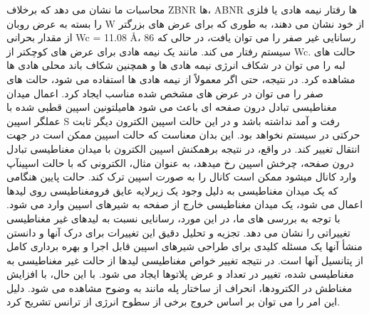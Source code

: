 محاسبات ما نشان می دهد که برخلاف ZBNR ها، ABNR ها رفتار نیمه هادی یا فلزی را بسته به عرض روبان W از خود نشان می دهند، به طوری که برای عرض های بزرگتر از مقدار بحرانی Wc = 11.08 Å، 86 رسانایی غیر صفر را می توان یافت، در حالی که سیستم رفتار می کند. مانند یک نیمه هادی برای عرض های کوچکتر از Wc. حالت های لبه را می توان در شکاف انرژی نیمه هادی ها و همچنین شکاف باند محلی هادی ها مشاهده کرد. در نتیجه، حتی اگر معمولاً از نیمه هادی ها استفاده می شود، حالت های صفر را می توان در عرض های مشخص شده مناسب ایجاد کرد. اعمال میدان مغناطیسی تبادل درون صفحه ای باعث می شود هامیلتونین اسپین قطبی شده با عملگر اسپین S رفت و آمد نداشته باشد و در این حالت اسپین الکترون دیگر ثابت حرکتی در سیستم نخواهد بود. این بدان معناست که حالت اسپین ممکن است در جهت انتقال تغییر کند. در واقع، در نتیجه برهمکنش اسپین الکترون با میدان مغناطیسی تبادل درون صفحه، چرخش اسپین رخ میدهد، به عنوان مثال، الکترونی که با حالت اسپینآپ وارد کانال میشود ممکن است کانال را به صورت اسپین ترک کند. حالت پایین هنگامی که یک میدان مغناطیسی به دلیل وجود یک زیرلایه عایق فرومغناطیسی روی لیدها اعمال می شود، یک میدان مغناطیسی خارج از صفحه به شیرهای اسپین وارد می شود. با توجه به بررسی های ما، در این مورد، رسانایی نسبت به لیدهای غیر مغناطیسی تغییراتی را نشان می دهد. تجزیه و تحلیل دقیق این تغییرات برای درک آنها و دانستن منشأ آنها یک مسئله کلیدی برای طراحی شیرهای اسپین قابل اجرا و بهره برداری کامل از پتانسیل آنها است. در نتیجه تغییر خواص مغناطیسی لیدها از حالت غیر مغناطیسی به مغناطیسی شده، تغییر در تعداد و عرض پلاتوها ایجاد می شود. با این حال، با افزایش مغناطش در الکترودها، انحراف از ساختار پله مانند به وضوح مشاهده می شود. دلیل این امر را می توان بر اساس خروج برخی از سطوح انرژی از ترانس تشریح کرد.
